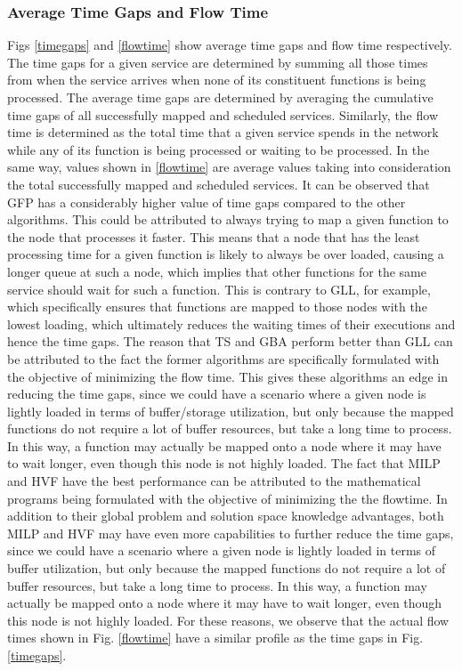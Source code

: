 \documentclass[conference]{IEEEtran}
\begin{document}
\subsubsection{Average Time Gaps and Flow Time} Figs \ref{timegaps} and \ref{flowtime} show average time gaps and flow time respectively. The time gaps for a given service are determined by summing all those times from when the service arrives when none of its constituent functions is being processed. The average time gaps are determined by averaging the cumulative time gaps of all successfully mapped and scheduled services. Similarly, the flow time is determined as the total time that a given service spends in the network while any of its function is being processed or waiting to be processed. In the same way, values shown in \ref{flowtime} are average values taking into consideration the total successfully mapped and scheduled services. It can be observed that GFP has a considerably higher value of time gaps compared to the other algorithms. This could be attributed to always trying to map a given function to the node that processes it faster. This means that a node that has the least processing time for a given function is likely to always be over loaded, causing a longer queue at such a node, which implies that other functions for the same service should wait for such a function. This is contrary to GLL, for example, which specifically ensures that functions are mapped to those nodes with the lowest loading, which ultimately reduces the waiting times of their executions and hence the time gaps. The reason that TS and GBA perform better than GLL can be attributed to the fact the former algorithms are specifically formulated with the objective of minimizing the flow time. This gives these algorithms an edge in reducing the time gaps, since we could have a scenario where a given node is lightly loaded in terms of buffer/storage utilization, but only because the mapped functions do not require a lot of buffer resources, but take a long time to process. In this way, a function may actually be mapped onto a node where it may have to wait longer, even though this node is not highly loaded. The fact that MILP and HVF have the best performance can be attributed to the mathematical programs being formulated with the objective of minimizing the the flowtime. In addition to their global problem and solution space knowledge advantages, both MILP and HVF may have even more capabilities to further reduce the time gaps, since we could have a scenario where a given node is lightly loaded in terms of buffer utilization, but only because the mapped functions do not require a lot of buffer resources, but take a long time to process. In this way, a function may actually be mapped onto a node where it may have to wait longer, even though this node is not highly loaded. For these reasons, we observe that the actual flow times shown in Fig. \ref{flowtime} have a similar profile as the time gaps in Fig. \ref{timegaps}.
\end{document}
